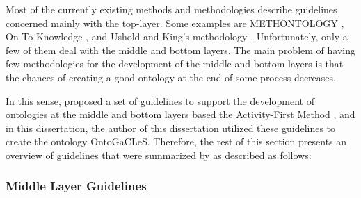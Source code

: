 Most of the currently existing methods and methodologies describe guidelines concerned mainly with the top-layer. Some examples are METHONTOLOGY \cite{Fernandez-LopezGomez-PerezJuristo1997}, On-To-Knowledge \cite{SureStaabStuder2004}, and Ushold and King's methodology \cite{UscholdKing1995}. Unfortunately, only a few of them deal with the middle and bottom layers.  The main problem of having few methodologies for the development of the middle and bottom layers is that the chances of creating a good ontology at the end of some process decreases.

In this sense,  proposed a set of guidelines to support the development of ontologies at the middle and bottom layers based the Activity-First Method \cite{Mizoguchi1995}, and in this dissertation, the author of this dissertation utilized these guidelines to create the ontology OntoGaCLeS. Therefore, the rest of this section presents an overview of guidelines \cite{Mizoguchi2003,Mizoguchi2004a,Mizoguchi2004} that were summarized by  as described as follows:

\subsubsection*{Middle Layer Guidelines}
\label{subsubsec:middle-layer}

